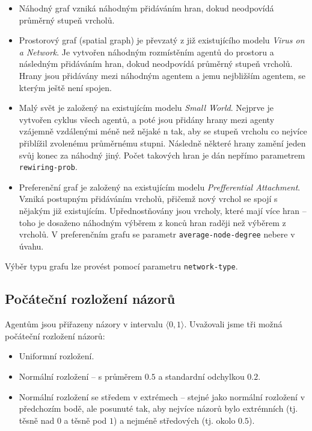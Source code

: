 \documentclass[10pt,a4paper]{report}
\begin{document}
\begin{itemize}
	\item Náhodný graf vzniká náhodným přidáváním hran, dokud neodpovídá prů\-měr\-ný stupeň vrcholů.
	\item Prostorový graf (spatial graph) je převzatý z již existujícího modelu \textit{Virus on a Network}. Je vytvořen náhodným rozmístěním agentů do prostoru a následným přidáváním hran, dokud neodpovídá průměrný stupeň vrcholů. Hrany jsou přidávány mezi náhodným agentem a jemu nejbližším agentem, se kterým ještě není spojen.
	\item Malý svět je založený na existujícím modelu \textit{Small World}. Nejprve je vytvořen cyklus všech agentů, a poté jsou přidány hrany mezi agenty vzájemně vzdálenými méně než nějaké n tak, aby se stupeň vrcholu co nejvíce přiblížil zvolenému průměrnému stupni. Následně některé hrany zamění jeden svůj konec za náhodný jiný. Počet takových hran je dán nepřímo parametrem \texttt{rewiring-prob}.
	\item Preferenční graf je založený na existujícím modelu \textit{Prefferential Attachment}. Vzniká postupným přidáváním vrcholů, přičemž nový vrchol se spojí s nějakým již existujícím. Upřednostňovány jsou vrcholy, které mají více hran -- toho je dosaženo náhodným výběrem z konců hran raději než výběrem z vrcholů. V preferenčním grafu se parametr \texttt{average\--node\--degree} nebere v úvahu.
\end{itemize}

Výběr typu grafu lze provést pomocí parametru \texttt{network-type}.

\subsection{Počáteční rozložení názorů}
Agentům jsou přiřazeny názory v intervalu $\langle 0, 1 \rangle$. Uvažovali jsme tři možná počáteční rozložení názorů:

\begin{itemize}
	\item Uniformní rozložení.
	\item Normální rozložení -- s průměrem $0.5$ a standardní odchylkou $0.2$.
	\item Normální rozložení se středem v extrémech -- stejné jako normální rozložení v předchozím bodě, ale posunuté tak, aby nejvíce názorů bylo extrémních (tj. těsně nad $0$ a těsně pod $1$) a nejméně středových (tj. okolo $0.5$).
\end{itemize}
\end{document}
